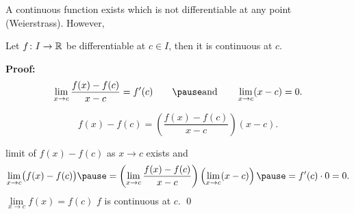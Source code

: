 \documentclass[10pt,aspectratio=169]{beamer}
\begin{document}
\begin{frame}
A continuous function exists which is not differentiable at any point
(Weierstrass).
\pause
However,

\begin{proposition}
Let $f \colon I \to {\mathbb{R}}$ be differentiable at $c \in I$,
then it is continuous at $c$.
\end{proposition}

\pause
\textbf{Proof:}
\begin{equation*}
\lim_{x\to c}\frac{f(x)-f(c)}{x-c} = f'(c)
\qquad
\pause
\text{and}
\qquad
\lim_{x\to c}(x-c) = 0 .
\end{equation*}

\pause
\begin{equation*}
f(x)-f(c) = 
\left( \frac{f(x)-f(c)}{x-c} \right) (x-c) .
\end{equation*}

\pause
\thus \quad limit of $f(x)-f(c)$ as $x \to c$ exists
\pause
and
\begin{equation*}
\lim_{x\to c} \bigl( f(x)-f(c) \bigr)
\pause
=
\left(\lim_{x\to c} \frac{f(x)-f(c)}{x-c} \right)
\left(\lim_{x\to c} (x-c) \right)
\pause
=
f'(c) \cdot 0  = 0.
\end{equation*}
\pause
\thus \quad $\lim\limits_{x\to c} f(x) = f(c)$
\pause
\wthus $f$ is continuous at $c$.
\qed

\end{frame}
\end{document}
